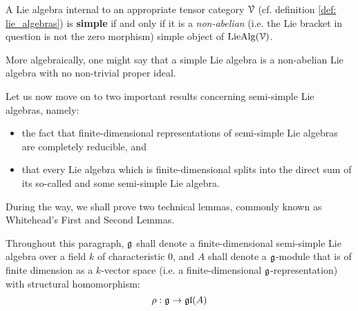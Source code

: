             \begin{definition} \label{def: simple_lie_algebras}
                A Lie algebra internal to an appropriate tensor category $\mathcal{V}$ (cf. definition \ref{def: lie_algebras}) is \textbf{simple} if and only if it is a \textit{non-abelian} (i.e. the Lie bracket in question is not the zero morphism) simple object of $\mathrm{Lie}\mathrm{Alg}(\mathcal{V})$.
                
                More algebraically, one might say that a simple Lie algebra is a non-abelian Lie algebra with no non-trivial proper ideal.
            \end{definition}
        
            Let us now move on to two important results concerning semi-simple Lie algebras, namely:
                \begin{itemize}
                    \item the fact that finite-dimensional representations of semi-simple Lie algebras are completely reducible, and
                    \item that every Lie algebra which is finite-dimensional splits into the direct sum of its so-called  and some semi-simple Lie algebra. 
                \end{itemize}
            During the way, we shall prove two technical lemmas, commonly known as Whitehead's First and Second Lemmas.
            
            \begin{convention} \label{conv: cohomology_of_semi_simple_lie_algebras_conventions}
                Throughout this paragraph, $\mathfrak{g}$ shall denote a finite-dimensional semi-simple Lie algebra over a field $k$ of characteristic $0$, and $A$ shall denote a $\mathfrak{g}$-module that is of finite dimension as a $k$-vector space (i.e. a finite-dimensional $\mathfrak{g}$-representation) with structural homomorphism:
                    $$\rho: \mathfrak{g} \to \mathfrak{gl}(A)$$
            \end{convention}
            
